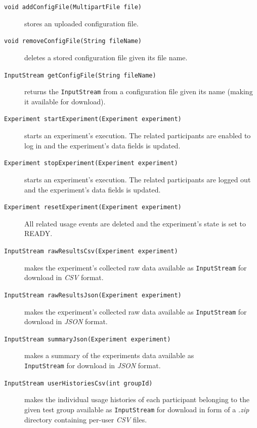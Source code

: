 \documentclass[a4paper]{usiinfbachelorproject}
\begin{document}
\begin{description}
        \item[\texttt{void addConfigFile(MultipartFile file)}] stores an uploaded configuration file.

        \item[\texttt{void removeConfigFile(String fileName)}] deletes a stored configuration file given its file name.

        \item[\texttt{InputStream getConfigFile(String fileName)}] returns the \texttt{InputStream} from a configuration file given its name 
                    (making it available for download).

        \item[\texttt{Experiment startExperiment(Experiment experiment)}] starts an experiment's execution. The related participants are enabled
                    to log in and the experiment's data fields is updated.

        \item[\texttt{Experiment stopExperiment(Experiment experiment)}] starts an experiment's execution. The related participants are 
                    logged out and the experiment's data fields is updated.

        \item[\texttt{Experiment resetExperiment(Experiment experiment)}] All related usage events are deleted
	                and the experiment's state is set to READY.

        \item[\texttt{InputStream rawResultsCsv(Experiment experiment)}] makes the experiment's collected raw data available
                    as \texttt{InputStream} for download in \emph{CSV} format.

        \item[\texttt{InputStream rawResultsJson(Experiment experiment)}] makes the experiment's collected raw data available
                    as \texttt{InputStream} for download in \emph{JSON} format.

        \item[\texttt{InputStream summaryJson(Experiment experiment)}] makes a summary of the experiments data
                    available as \\ \texttt{InputStream} for download in \emph{JSON} format.

        \item[\texttt{InputStream userHistoriesCsv(int groupId)}] makes the individual usage histories of each participant
                    belonging to the given test group available as \texttt{InputStream} for download in form of a \emph{.zip}
                    directory containing per-user \emph{CSV} files.


\end{description}
\end{document}
